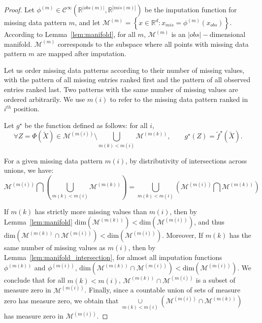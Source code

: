 \documentclass{article}
\newcommand{\RR}{\mathbb{R}}
\newcommand{\Ccal}{\mathcal{C}}
\newcommand{\Mcal}{\mathcal{M}}
\newcommand{\br}[1]{\left(#1\right)}
\newcommand{\cbr}[1]{\left\{#1\right\}}
\theoremstyle{plain}
\begin{document}
\fbp*

\begin{proof}
    Let $\phi^{(m)}\in \Ccal^\infty\br{\RR^{|obs(m)|}, \RR^{|mis(m)|}}$ be the imputation function for missing data pattern $m$, and let $\Mcal^{(m)} = \cbr{x \in \RR^d: x_{mis} = \phi^{(m)}(x_{obs})}$. According to Lemma~\ref{lem:manifold}, for all $m$, $\Mcal^{(m)}$ is an $|obs|-$dimensional manifold. $\Mcal^{(m)}$ corresponds to the subspace where all points with missing data pattern $m$ are mapped after imputation.
    
    Let us order missing data patterns according to their number of missing values, with the pattern of all missing entries ranked first and the pattern of all observed entries ranked last. Two patterns with the same number of missing values are ordered arbitrarily. We use $m(i)$ to refer to the missing data pattern ranked in $i^{th}$ position.
    
    Let $g^\star$ be the function defined as follows: for all $i$, 
    \begin{equation*}
        \forall Z=\Phi(\widetilde X) \in \Mcal^{(m(i))} \setminus \bigcup\limits_{m(k) < m(i)}  \Mcal^{(m(k))}, \qquad g^\star(Z) = \tilde f^{\star}(\widetilde X).
    \end{equation*}
    
    For a given missing data pattern $m(i)$, by distributivity of intersections across unions, we have:
    \begin{equation*}
        \Mcal^{(m(i))} \bigcap \br{ \bigcup\limits_{m(k) < m(i)}  \Mcal^{(m(k))}} = \underset{m(k) < m(i)} {\bigcup}\br{\Mcal^{(m(i))}  \bigcap \Mcal^{(m(k))}} 
    \end{equation*}
    
    If $m(k)$ has strictly more missing values than $m(i)$, then by Lemma~\ref{lem:manifold} $\text{dim}(\Mcal^{(m(k))}) <  \text{dim}(\Mcal^{(m(i))})$, and thus $\text{dim}(\Mcal^{(m(k))} \cap \Mcal^{(m(i))}) < \text{dim}(\Mcal^{(m(i))})$. Moreover, If $m(k)$ has the same number of missing values as $m(i)$, then by Lemma~\ref{lem:manifold_intersection}, for almost all imputation functions $\phi^{(m(k))}$ and $\phi^{(m(i))}$, $\text{dim}(\Mcal^{(m(k))} \cap \Mcal^{(m(i))}) < \text{dim}(\Mcal^{(m(i))})$. We conclude that for all $m(k) < m(i)$, $\Mcal^{(m(k))} \cap \Mcal^{(m(i))}$ is a subset of measure zero in $\Mcal^{(m(i))}$. Finally, since a countable union of sets of measure zero has measure zero, we obtain that $\underset{m(k) < m(i)} {\cup}\br{\Mcal^{(m(i))} \cap \Mcal^{(m(k))}}$ has measure zero in $\Mcal^{(m(i))}$.
    

\end{proof}
\end{document}
